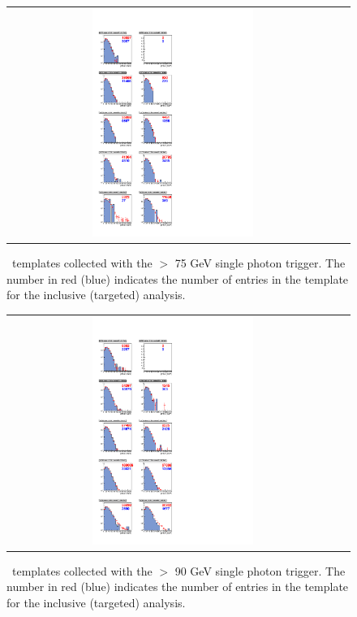 \clearpage

\begin{figure}[!h]
\begin{center}
\begin{tabular}{cc}
\includegraphics[width=0.5\textwidth]{plots/template_targeted_3_19p5fb.pdf}
\end{tabular}
\caption{
\MET\ templates collected with the \pt $>$ 75 GeV single photon trigger.
The number in red (blue) indicates the number of entries in the template for the inclusive (targeted) analysis.
}
\end{center}
\end{figure}

\clearpage

\begin{figure}[!h]
\begin{center}
\begin{tabular}{cc}
\includegraphics[width=0.5\textwidth]{plots/template_targeted_4_19p5fb.pdf}
\end{tabular}
\caption{
\MET\ templates collected with the \pt $>$ 90 GeV single photon trigger.
The number in red (blue) indicates the number of entries in the template for the inclusive (targeted) analysis.
}
\end{center}
\end{figure}
